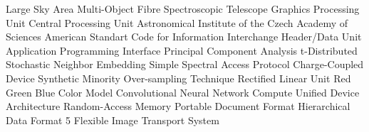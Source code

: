   {Large Sky Area Multi-Object Fibre Spectroscopic Telescope}
     {Graphics Processing Unit}
     {Central Processing Unit}
 {Astronomical Institute of the Czech Academy of Sciences}
   {American Standart Code for Information Interchange}
     {Header/Data Unit}
     {Application Programming Interface}
     {Principal Component Analysis}
   {t-Distributed Stochastic Neighbor Embedding}
    {Simple Spectral Access Protocol}
     {Charge-Coupled Device}
   {Synthetic Minority Over-sampling Technique}
    {Rectified Linear Unit}
     {Red Green Blue Color Model}
     {Convolutional Neural Network}
    {Compute Unified Device Architecture}
     {Random-Access Memory}
     {Portable Document Format}
    {Hierarchical Data Format 5}
    {Flexible Image Transport System}
